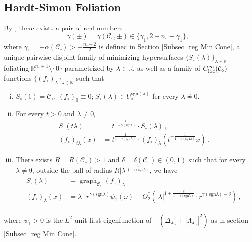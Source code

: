\documentclass[11pt, letterpaper, reqno]{amsart}
\numberwithin{equation}{section}
\theoremstyle{remark}
\newcommand{\RR}{\mathbb{R}}
\newcommand{\cC}{\mathcal{C}}
\newcommand{\cL}{\mathcal{L}}
\newcommand{\graph}{\operatorname{graph}}
\begin{document}
  
  \subsection{Hardt-Simon Foliation} \label{Subsec_HS foliation}
   By \cite{HardtSimon:isolated}, there exists a pair of real numbers
   \[ \gamma(\pm) = \gamma(\cC_\circ, \pm)\in \{\gamma_1, 2-n_\circ -\gamma_1\}, \]
   where $\gamma_1 = -\alpha(\cC_\circ)>-\frac{n_\circ - 2}{2}$ is defined in Section \ref{Subsec_reg Min Cone}, a unique pairwise-disjoint family of minimizing hypersurfaces $\{{S}_\circ(\lambda)\}_{\lambda\in \RR}$ foliating $\RR^{n_\circ+1}\setminus \{0\}$ parametrized by $\lambda\in\RR$, as well as a family of $C^\infty_{\textnormal{loc}}(\cC_\circ)$ functions $\{(f_\circ)_\lambda\}_{\lambda\in \RR}$ such that
   \begin{enumerate}[(i)]
    \item ${S}_\circ(0)=\cC_\circ$, $(f_\circ)_0 \equiv 0$; ${S}_\circ(\lambda)\in U_\circ^{\textrm{sgn}(\lambda)}$ for every $\lambda\neq 0$.
    \item For every $t>0$ and $\lambda\neq 0$,
    \begin{align}
      {S}_\circ(t\lambda) & = t^{\frac1{1-\gamma(\textrm{sgn}\lambda)}} \cdot {S}_\circ(\lambda)\,, \label{Equ_HS_scal H_0(lambda)}\\
      (f_\circ)_{t\lambda}(x) & = t^{\frac{1}{1-\gamma(\textrm{sgn}\lambda)}}\cdot (f_\circ)_{\lambda}(t^{-\frac{1}{1-\gamma(\textrm{sgn}\lambda)}}x) \label{Equ_HS_scal f_lambda} \,.
    \end{align} 
    \item There exists $R=R(\cC_\circ)>1$ and $\delta=\delta(\cC_\circ)\in (0, 1)$ such that for every $\lambda\neq 0$, outside the ball of radius $R|\lambda|^{\frac{1}{1-\gamma(\textrm{sgn}\lambda)}}$, we have 
    \begin{align}
     \begin{split}
      {S}_\circ(\lambda) & = \graph_{\cC_\circ} (f_\circ)_\lambda \\
      (f_\circ)_\lambda(x) & = \lambda\cdot r^{\gamma(\textrm{sgn}\lambda)}\psi_1(\omega) + O_2^*\left(|\lambda|^{1+\frac{\delta}{1-\gamma(\textrm{sgn}\lambda)}}\cdot r^{\gamma(\textrm{sgn}\lambda) -\delta} \right)\,,  
     \end{split} \label{Equ_HS_f_lambda = lambda r^gamma}
    \end{align}
   \end{enumerate}
   where $\psi_1>0$ is the $L^2$-unit first eigenfunction of $-(\Delta_{\cL_\circ} + |A_{\cL_\circ}|^2)$ as in section \ref{Subsec_reg Min Cone}. 
   
\end{document}
